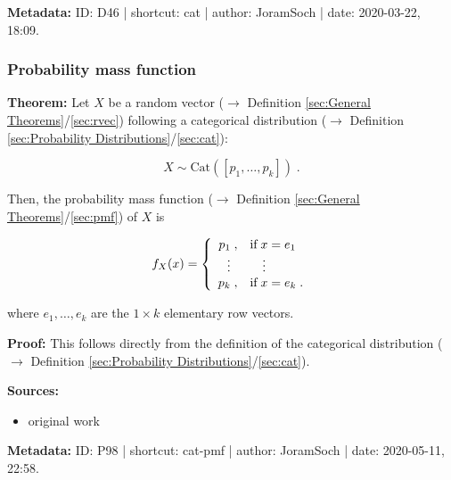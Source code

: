 \documentclass[a4paper,12pt,twoside]{book}
\begin{document}
\vspace{1em}
\textbf{Metadata:} ID: D46 | shortcut: cat | author: JoramSoch | date: 2020-03-22, 18:09.
\vspace{1em}



\subsubsection[\textbf{Probability mass function}]{Probability mass function} \label{sec:cat-pmf}
\setcounter{equation}{0}

\textbf{Theorem:} Let $X$ be a random vector ($\rightarrow$ Definition \ref{sec:General Theorems}/\ref{sec:rvec}) following a categorical distribution ($\rightarrow$ Definition \ref{sec:Probability Distributions}/\ref{sec:cat}):

\begin{equation} \label{eq:cat-pmf-cat}
X \sim \mathrm{Cat}(\left[p_1, \ldots, p_k \right]) \; .
\end{equation}

Then, the probability mass function ($\rightarrow$ Definition \ref{sec:General Theorems}/\ref{sec:pmf}) of $X$ is

\begin{equation} \label{eq:cat-pmf-cat-pmf}
f_X(x) = \left\{
\begin{array}{rl}
p_1 \; , & \text{if} \; x = e_1 \\
\vdots \; \hphantom{,} & \quad \vdots \\
p_k \; , & \text{if} \; x = e_k \; . \\
\end{array}
\right.
\end{equation}

where $e_1, \ldots, e_k$ are the $1 \times k$ elementary row vectors.


\vspace{1em}
\textbf{Proof:} This follows directly from the definition of the categorical distribution ($\rightarrow$ Definition \ref{sec:Probability Distributions}/\ref{sec:cat}).


\vspace{1em}
\textbf{Sources:}
\begin{itemize}
\item original work\end{itemize}


\vspace{1em}
\textbf{Metadata:} ID: P98 | shortcut: cat-pmf | author: JoramSoch | date: 2020-05-11, 22:58.
\vspace{1em}
\end{document}
